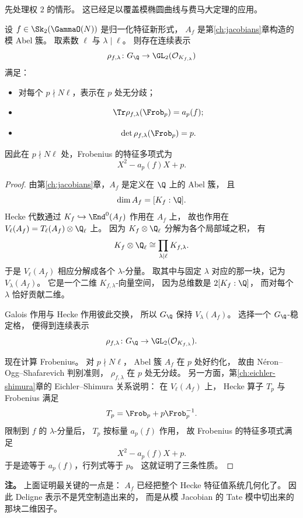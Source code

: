 先处理权 $2$ 的情形。
这已经足以覆盖模椭圆曲线与费马大定理的应用。

\begin{theorem}
\label{thm:ch09-deligne-weight-two}
设 $f\in \Sk_2(\GammaO(N))$ 是归一化特征新形式，
$A_f$ 是第\ref{ch:jacobians}章构造的模 Abel 簇。
取素数 $\ell$ 与 $\lambda\mid \ell$。
则存在连续表示
\[
  \rho_{f,\lambda}\colon G_\Q\to \GL_2(\mathcal O_{K_{f,\lambda}})
\]
满足：
\begin{itemize}
  \item[(i)] 对每个 $p\nmid N\ell$，表示在 $p$ 处无分歧；
  \item[(ii)]
  \[
    \Tr\rho_{f,\lambda}(\Frob_p)=a_p(f);
  \]
  \item[(iii)]
  \[
    \det\rho_{f,\lambda}(\Frob_p)=p.
  \]
\end{itemize}
因此在 $p\nmid N\ell$ 处，Frobenius 的特征多项式为
\[
  X^2-a_p(f)X+p.
\]
\end{theorem}

\begin{proof}
由第\ref{ch:jacobians}章，$A_f$ 是定义在 $\Q$ 上的 Abel 簇，
且
\[
  \dim A_f=[K_f:\Q].
\]
Hecke 代数通过 $K_f\hookrightarrow \End^0(A_f)$ 作用在 $A_f$ 上，
故也作用在 $V_\ell(A_f)=T_\ell(A_f)\otimes \Q_\ell$ 上。
因为 $K_f\otimes \Q_\ell$ 分解为各个局部域之积，
有
\[
  K_f\otimes \Q_\ell\cong \prod_{\lambda\mid\ell} K_{f,\lambda}.
\]
于是 $V_\ell(A_f)$ 相应分解成各个 $\lambda$-分量。
取其中与固定 $\lambda$ 对应的那一块，记为 $V_\lambda(A_f)$。
它是一个二维 $K_{f,\lambda}$-向量空间，
因为总维数是 $2[K_f:\Q]$，
而对每个 $\lambda$ 恰好贡献二维。

Galois 作用与 Hecke 作用彼此交换，
所以 $G_\Q$ 保持 $V_\lambda(A_f)$。
选择一个 $G_\Q$-稳定格，
便得到连续表示
\[
  \rho_{f,\lambda}\colon G_\Q\to \GL_2(\mathcal O_{K_{f,\lambda}}).
\]

现在计算 Frobenius。
对 $p\nmid N\ell$，
Abel 簇 $A_f$ 在 $p$ 处好约化，
故由 N\'eron--Ogg--Shafarevich 判别准则，
$\rho_{f,\lambda}$ 在 $p$ 处无分歧。
另一方面，第\ref{ch:eichler-shimura}章的 Eichler--Shimura 关系说明：
在 $V_\ell(A_f)$ 上，
Hecke 算子 $T_p$ 与 Frobenius 满足
\[
  T_p=\Frob_p+p\Frob_p^{-1}.
\]
限制到 $f$ 的 $\lambda$-分量后，
$T_p$ 按标量 $a_p(f)$ 作用，
故 Frobenius 的特征多项式满足
\[
  X^2-a_p(f)X+p.
\]
于是迹等于 $a_p(f)$，行列式等于 $p$。
这就证明了三条性质。
\end{proof}

\textbf{注。}
上面证明最关键的一点是：
$A_f$ 已经把整个 Hecke 特征值系统几何化了。
因此 Deligne 表示不是凭空制造出来的，
而是从模 Jacobian 的 Tate 模中切出来的那块二维因子。


